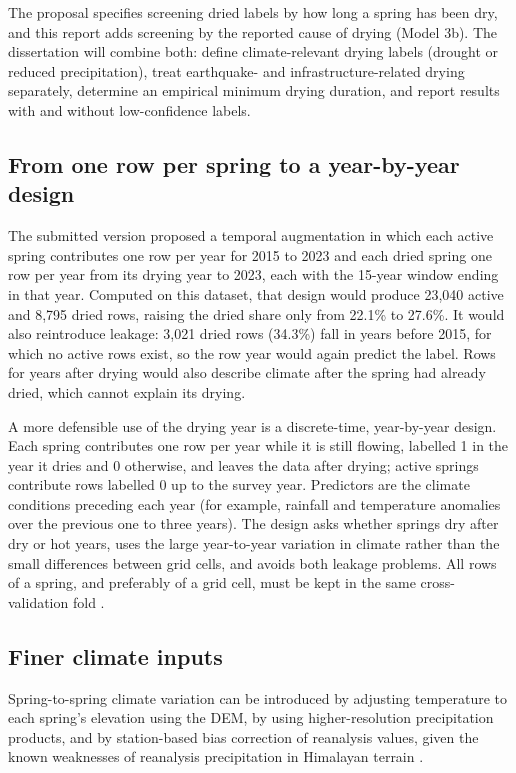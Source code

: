\documentclass[12pt,a4paper]{article}
\begin{document}
The proposal specifies screening dried labels by how long a spring has been dry, and this report adds screening by the reported cause of drying (Model 3b). The dissertation will combine both: define climate-relevant drying labels (drought or reduced precipitation), treat earthquake- and infrastructure-related drying separately, determine an empirical minimum drying duration, and report results with and without low-confidence labels.

\subsection{From one row per spring to a year-by-year design}\label{sec:augmentation}

The submitted version proposed a temporal augmentation in which each active spring contributes one row per year for 2015 to 2023 and each dried spring one row per year from its drying year to 2023, each with the 15-year window ending in that year. Computed on this dataset, that design would produce 23,040 active and 8,795 dried rows, raising the dried share only from 22.1\% to 27.6\%. It would also reintroduce leakage: 3,021 dried rows (34.3\%) fall in years before 2015, for which no active rows exist, so the row year would again predict the label. Rows for years after drying would also describe climate after the spring had already dried, which cannot explain its drying.

A more defensible use of the drying year is a discrete-time, year-by-year design. Each spring contributes one row per year while it is still flowing, labelled 1 in the year it dries and 0 otherwise, and leaves the data after drying; active springs contribute rows labelled 0 up to the survey year. Predictors are the climate conditions preceding each year (for example, rainfall and temperature anomalies over the previous one to three years). The design asks whether springs dry after dry or hot years, uses the large year-to-year variation in climate rather than the small differences between grid cells, and avoids both leakage problems. All rows of a spring, and preferably of a grid cell, must be kept in the same cross-validation fold \citep{roberts2017,john2025}.

\subsection{Finer climate inputs}

Spring-to-spring climate variation can be introduced by adjusting temperature to each spring's elevation using the DEM, by using higher-resolution precipitation products, and by station-based bias correction of reanalysis values, given the known weaknesses of reanalysis precipitation in Himalayan terrain \citep{khadka2022,lavers2022}.
\end{document}

